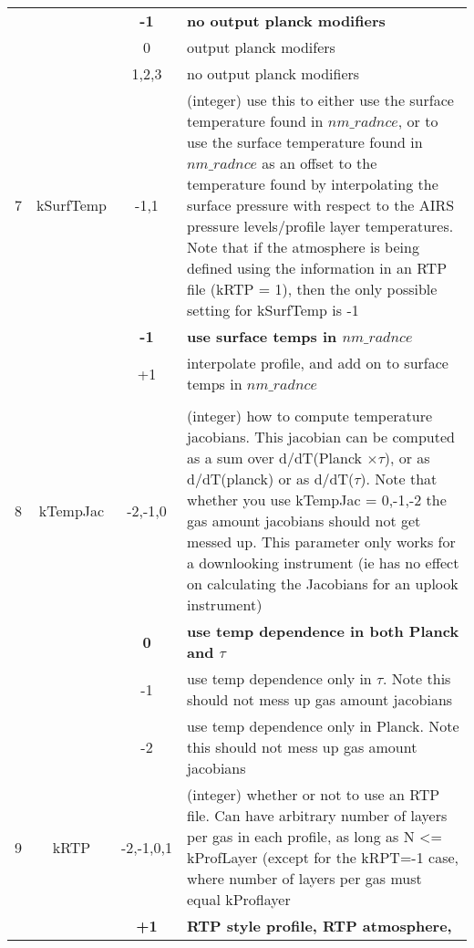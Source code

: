 \documentclass[12pt]{article}
\newlength{\colwidth}
\newlength{\colwidthshort}
\begin{document}
\begin{small}
\begin{longtable}{|c|c|c|p{\colwidthshort}|}
{   &  & {\bf -1}    & {\bf no output planck modifiers} \\
   &  & 0           & output planck modifers\\
   &  & 1,2,3       & no output planck modifiers \\
\hline
7 & {\sf kSurfTemp}   & -1,1 & (integer) use this to either use the surface 
temperature found in $nm\_radnce$, or to use the surface temperature found in 
$nm\_radnce$ as an offset to the temperature found by interpolating the 
surface pressure with respect to the AIRS pressure levels/profile layer
temperatures. Note that if the atmosphere is being defined using the 
information in an RTP file (kRTP = 1), then the only possible setting for
kSurfTemp is -1\\ 
  &         & {\bf -1}   & {\bf use surface temps in $nm\_radnce$}\\
  &         & {+1}   & {interpolate profile, and add on to 
                                      surface temps in $nm\_radnce$}\\
\\ \hline
8 & {\sf kTempJac}   & -2,-1,0   & (integer) how to compute temperature 
jacobians. This jacobian can be computed as a sum over d/dT(Planck $\times 
\tau$), or as d/dT(planck) or as d/dT($\tau$). Note that whether
you use kTempJac = 0,-1,-2 the gas amount jacobians should not get messed 
up. This parameter only works for a downlooking instrument (ie has no effect on
calculating the Jacobians for an uplook instrument) \\
  &              & {\bf 0}  & {\bf use temp dependence in both Planck 
                               and $\tau$}\\
  &              & {-1}  & use temp dependence only in $\tau$. Note this
                              should not mess up gas amount jacobians \\
  &              & {-2}  & use temp dependence only in Planck. Note this
                              should not mess up gas amount jacobians \\ \hline
9 & {\sf kRTP}   & -2,-1,0,1   & (integer) whether or not to use an RTP file. 
                                 Can have arbitrary number of layers per gas in
                                 each profile, as long as N <= kProfLayer 
                                 (except for the kRPT=-1 case, where number of
                                  layers per gas must equal kProflayer \\
  &              & {\bf +1}  & {\bf RTP style profile, RTP atmosphere, 
}}
\end{longtable}
\end{small}
\end{document}
